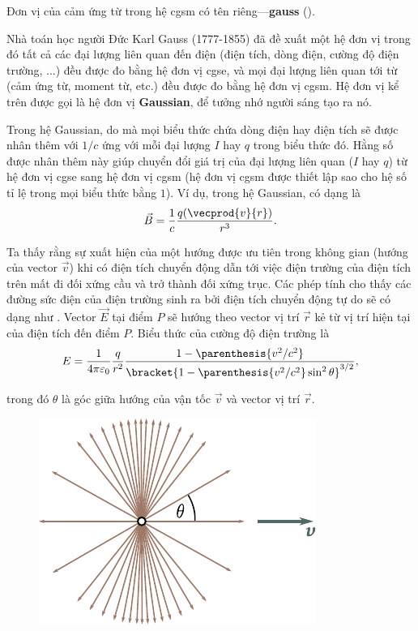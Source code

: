 Đơn vị của cảm ứng từ trong hệ cgsm có tên riêng---\textbf{gauss} (\si{\gauss}).

Nhà toán học người Đức Karl Gauss (1777-1855) đã đề xuất một hệ đơn vị trong đó tất cả các đại lượng liên quan đến điện (điện tích, dòng điện, cường độ điện trường, ...) đều được đo bằng hệ đơn vị cgse, và mọi đại lượng liên quan tới từ (cảm ứng từ, moment từ, etc.) đều được đo bằng hệ đơn vị cgsm. Hệ đơn vị kể trên được gọi là hệ đơn vị \textbf{Gaussian}, để tưởng nhớ người sáng tạo ra nó.

Trong hệ Gaussian, do  mà mọi biểu thức chứa dòng điện hay điện tích sẽ được nhân thêm với $1/c$ ứng với mỗi đại lượng $I$ hay $q$ trong biểu thức đó. Hằng số được nhân thêm này giúp chuyển đổi giá trị của đại lượng liên quan ($I$ hay $q$) từ hệ đơn vị cgse sang hệ đơn vị cgsm (hệ đơn vị cgsm được thiết lập sao cho hệ số tỉ lệ trong mọi biểu thức bằng $1$). Ví dụ, trong hệ Gaussian,  có dạng là
\begin{equation}\label{eq:6_24}
    \vec{B} = \frac{1}{c} \frac{q (\vecprod{v}{r})}{r^3}.
\end{equation}

Ta thấy rằng sự xuất hiện của một hướng được ưu tiên trong không gian (hướng của vector $\vec{v}$) khi có điện tích chuyển động dẫn tới việc điện trường của điện tích trên mất đi đối xứng cầu và trở thành đối xứng trục. Các phép tính cho thấy các đường sức điện của điện trường sinh ra bởi điện tích chuyển động tự do sẽ có dạng như . Vector $\vec{E}$ tại điểm $P$ sẽ hướng theo vector vị trí $\vec{r}$ kẻ từ vị trí hiện tại của điện tích đến điểm $P$. Biểu thức của cường độ điện trường là
\begin{equation}\label{eq:6_25}
    E = \frac{1}{4\pi\varepsilon_0} \frac{q}{r^2} \frac{1 - \parenthesis{v^2/c^2}}{\bracket{1 - \parenthesis{v^2/c^2}\sin^2\theta}^{3/2}},
\end{equation}

\noindent
trong đó $\theta$ là góc giữa hướng của vận tốc $\vec{v}$ và vector vị trí $\vec{r}$.

\begin{figure}[t]
	\begin{center}
		\includegraphics[scale=1]{figures/ch_06/fig_6_2.pdf}
		\caption[]{}
		\label{fig:6_2}
	\end{center}
	\vspace{-0.8cm}
\end{figure}

